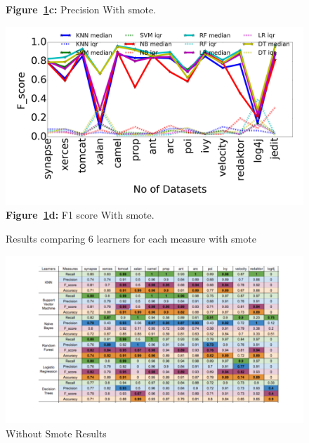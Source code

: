 \documentclass[conference]{IEEEtran}
\begin{document}
\begin{figure}[!htbp]
\begin{minipage}[b]{0.49\linewidth}
\begin{center}
  {\bf Figure~\ref{fig:smote}c:} Precision With smote.
  \end{center}
    \end{minipage}
    \begin{minipage}[b]{0.49\linewidth}
        \begin{center}
        \includegraphics[width=\linewidth]{F_score_smote.png}
  {\bf Figure~\ref{fig:smote}d:} F1 score With smote.
  \end{center}
    \end{minipage}
    \caption{Results comparing 6 learners for each measure with smote}\label{fig:smote}
\end{figure}


\begin{figure}[!htbp]
    \centering
    \includegraphics[scale=0.50]{non-smote.png}
        \caption{Without Smote Results}
    \label{fig:tablenosmote}
\end{figure}
\end{document}
